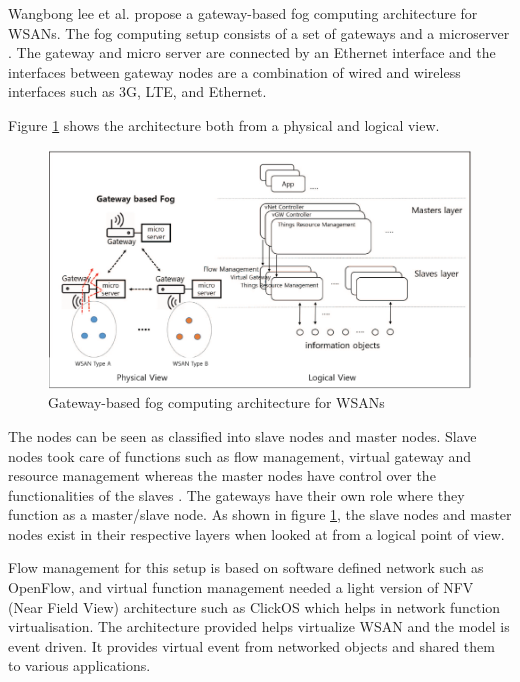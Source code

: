 \documentclass{article}
\begin{document}
Wangbong lee et al. \cite{lee2016gateway} propose a gateway-based fog computing architecture for WSANs. The fog computing setup consists of a set of gateways and a microserver \cite{lee2016gateway}.
The gateway and micro server are connected by an Ethernet interface and the interfaces between gateway nodes are a combination of wired and wireless interfaces such as 3G, LTE, and Ethernet\cite{lee2016gateway}.

Figure \ref{fig:gateway} shows the architecture both from a physical and logical view.

\begin{figure}[H]
	\centering
	\includegraphics[scale=0.5]{gateway.png}
	\caption{Gateway-based fog computing architecture for WSANs \cite{lee2016gateway}}
	\label{fig:gateway}
\end{figure} 

The nodes can be seen as classified into slave nodes and master nodes. Slave nodes took care of functions such as flow management, virtual gateway and resource management whereas the master nodes have control over the functionalities of the slaves \cite{lee2016gateway}. The gateways have their own role where they function as a master/slave node. As shown in figure \ref{fig:gateway}, the slave nodes and master nodes exist in their respective layers when looked at from a logical point of view. 

Flow management for this setup is based on software defined network such as OpenFlow, and virtual function management needed a light version of NFV (Near Field View) architecture such as ClickOS \cite{martins2014clickos} which helps in network function virtualisation.
The architecture provided helps virtualize WSAN and the model is event driven. It provides virtual event from networked objects and shared them to various applications.
\end{document}
